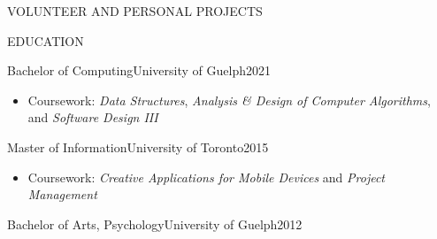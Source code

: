 \documentclass[]{mcdowellcv}
\begin{document}
\begin{cvsection}{VOLUNTEER AND PERSONAL PROJECTS}
\end{cvsection}

\begin{cvsection}{EDUCATION}
  \begin{cvsubsection}{Bachelor of Computing}{University of Guelph}{2021}
    \begin{itemize}
      \item Coursework: \textit{Data Structures}, \textit{Analysis \& Design of Computer
              Algorithms}, and \textit{Software Design III}
    \end{itemize}
  \end{cvsubsection}

  \begin{cvsubsection}{Master of Information}{University of Toronto}{2015}
    \begin{itemize}
      \item Coursework: \textit{Creative Applications for Mobile Devices} and
            \textit{Project Management}
    \end{itemize}
  \end{cvsubsection}

  \begin{cveducation}{Bachelor of Arts, Psychology}{University of Guelph}{2012}
  \end{cveducation}
\end{cvsection}
\end{document}
